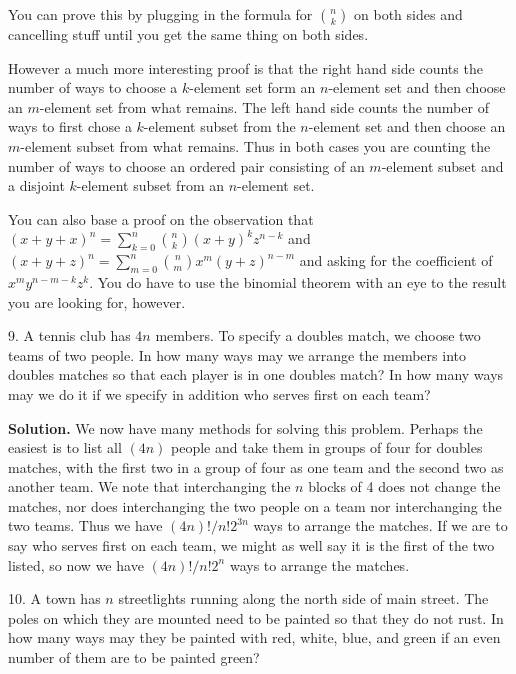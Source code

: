 \documentclass[10pt,]{book}
\theoremstyle{plain}
\theoremstyle{definition}
\theoremstyle{definition}
\numberwithin{equation}{chapter}
\begin{document}
\begin{exerciselist}
You can prove this by plugging in the formula for \(\binom{n}{k}\) on both sides and cancelling stuff until you get the same thing on both sides.%
\par
However a much more interesting proof is that the right hand side counts the number of ways to choose a \(k\)-element set form an \(n\)-element set and then choose an \(m\)-element set from what remains. The left hand side counts the number of ways to first chose a \(k\)-element subset from the \(n\)-element set and then choose an \(m\)-element subset from what remains. Thus in both cases you are counting the number of ways to choose an ordered pair consisting of an \(m\)-element subset and a disjoint \(k\)-element subset from an \(n\)-element set.%
\par
You can also base a proof on the observation that \((x+y+x)^n=
\sum_{k=0}^n\binom{n}{k}(x+y)^kz^{n-k}\) and \((x+y+z)^n=\sum_{m=0}^n\binom{n}{m}x^m(y+z)^{n-m}\) and asking for the coefficient of \(x^my^{n-m-k}z^k\). You do have to use the binomial theorem with an eye to the result you are looking for, however.%
\item[9.]\hypertarget{exercise-9}{}A tennis club has \(4n\) members.  To specify a doubles match, we choose two teams of two people.  In how many ways may we arrange the members into doubles matches so that each player is in one doubles match?  In how many ways may we do it if we specify in addition who serves first on each team?%
\par\smallskip
\par\smallskip
\noindent\textbf{Solution.}\hypertarget{solution-116}{}\quad
We now have many methods for solving this problem. Perhaps the easiest is to list all \((4n)\) people and take them in groups of four for doubles matches, with the first two in a group of four as one team and the second two as another team. We note that interchanging the \(n\) blocks of 4 does not change the matches, nor does interchanging the two people on a team nor interchanging the two teams. Thus we have \((4n)!/n!2^{3n}\) ways to arrange the matches. If we are to say who serves first on each team, we might as well say it is the first of the two listed, so now we have \((4n)!/n!2^n\) ways to arrange the matches.%
\item[10.]\hypertarget{exercise-10}{}A town has \(n\) streetlights running along the north side of main street.  The poles on which they are mounted need to be painted so that they do not rust.  In how many ways may they be painted with red, white, blue, and green if an even number of them are to be painted green?%

\end{exerciselist}
\end{document}

